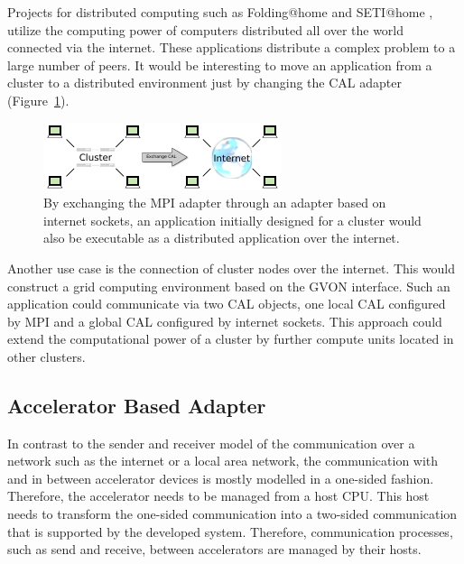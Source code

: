 Projects for distributed computing such as Folding@home
\cite{ref:folding_at_home} and SETI@home \cite{ref:seti_at_home},
utilize the computing power of computers distributed all over the
world connected via the internet.  These applications distribute a
complex problem to a large number of peers. It would be interesting
to move an application from a cluster to a distributed environment
just by changing the CAL adapter (Figure~\ref{fig:internet_cal}).

\begin{figure}[H]
  \centering \includegraphics[width=\textwidth]{graphics/60_internet_cal}
  \caption{By exchanging the MPI adapter through an adapter based on
    internet sockets, an application initially designed for a cluster
    would also be executable as a distributed application over the
    internet.}
  \label{fig:internet_cal}
\end{figure}

\noindent Another use case is the connection of cluster nodes over the
internet. This would construct a grid computing environment based on
the GVON interface. Such an application could communicate via two CAL
objects, one local CAL configured by MPI and a global CAL configured
by internet sockets.  This approach could extend the computational
power of a cluster by further compute units located in other clusters.

\subsection*{Accelerator Based Adapter}

In contrast to the sender and receiver model of the communication over
a network such as the internet or a local area network, the
communication with and in between accelerator devices is mostly
modelled in a one-sided fashion. Therefore, the accelerator needs to
be managed from a host CPU.  This host needs to transform the
one-sided communication into a two-sided communication that is
supported by the developed system. Therefore, communication processes,
such as send and receive, between accelerators are managed by their
hosts.


